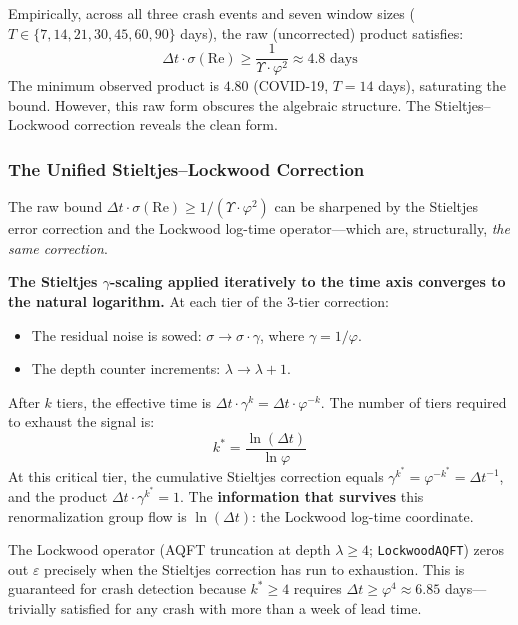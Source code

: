 Empirically, across all three crash events and seven window sizes ($T \in \{7, 14, 21, 30, 45, 60, 90\}$ days), the raw (uncorrected) product satisfies:
\begin{equation}\label{eq:market_uncertainty_raw}
    \Delta t \cdot \sigma(\mathrm{Re}) \geq \frac{1}{\Upsilon \cdot \varphi^2} \approx 4.8 \text{ days}
\end{equation}
The minimum observed product is $4.80$ (COVID-19, $T = 14$ days), saturating the bound. However, this raw form obscures the algebraic structure. The Stieltjes--Lockwood correction reveals the clean form.

\subsubsection{The Unified Stieltjes--Lockwood Correction}

The raw bound $\Delta t \cdot \sigma(\mathrm{Re}) \geq 1/(\Upsilon \cdot \varphi^2)$ can be sharpened by the Stieltjes error correction and the Lockwood log-time operator---which are, structurally, \emph{the same correction}.

\textbf{The Stieltjes $\gamma$-scaling applied iteratively to the time axis converges to the natural logarithm.} At each tier of the 3-tier correction:
\begin{itemize}[noitemsep]
    \item The residual noise is sowed: $\sigma \to \sigma \cdot \gamma$, where $\gamma = 1/\varphi$.
    \item The depth counter increments: $\lambda \to \lambda + 1$.
\end{itemize}
After $k$ tiers, the effective time is $\Delta t \cdot \gamma^k = \Delta t \cdot \varphi^{-k}$. The number of tiers required to exhaust the signal is:
\begin{equation}
    k^* = \frac{\ln(\Delta t)}{\ln \varphi}
\end{equation}
At this critical tier, the cumulative Stieltjes correction equals $\gamma^{k^*} = \varphi^{-k^*} = \Delta t^{-1}$, and the product $\Delta t \cdot \gamma^{k^*} = 1$. The \textbf{information that survives} this renormalization group flow is $\ln(\Delta t)$: the Lockwood log-time coordinate.

The Lockwood operator (AQFT truncation at depth $\lambda \geq 4$; \texttt{LockwoodAQFT}) zeros out $\varepsilon$ precisely when the Stieltjes correction has run to exhaustion. This is guaranteed for crash detection because $k^* \geq 4$ requires $\Delta t \geq \varphi^4 \approx 6.85$ days---trivially satisfied for any crash with more than a week of lead time.

